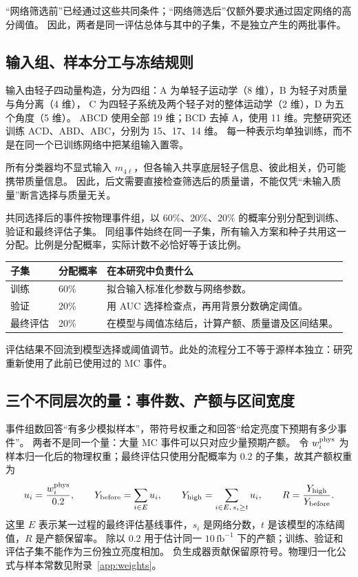 \documentclass[11pt,a4paper,fontset=fandol,scheme=plain]{ctexart}
\begin{document}
“网络筛选前”已经通过这些共同条件；“网络筛选后”仅额外要求通过固定网络的高分阈值。
因此，两者是同一评估总体与其中的子集，不是独立产生的两批事件。

\subsection{输入组、样本分工与冻结规则}

输入由轻子四动量构造，分为四组：A 为单轻子运动学（8 维），B 为轻子对质量与角分离（4 维），
C 为四轻子系统及两个轻子对的整体运动学（2 维），D 为五个角度（5 维）。
ABCD 使用全部 19 维；BCD 去掉 A，使用 11 维。完整研究还训练 ACD、ABD、ABC，分别为 15、17、14 维。
每一种表示均单独训练，而不是在同一个已训练网络中把某组输入置零。

所有分类器均不显式输入 $m_{4\ell}$，但各输入共享底层轻子信息、彼此相关，仍可能携带质量信息。
因此，后文需要直接检查筛选后的质量谱，不能仅凭“未输入质量”断言选择与质量无关。

共同选择后的事件按物理事件组，以 60\%、20\%、20\% 的概率分别分配到训练、验证和最终评估子集。
同组事件始终在同一子集，所有输入方案和种子共用这一分配。比例是分配概率，实际计数不必恰好等于该比例。

\begin{center}
\small
\begin{tabularx}{\linewidth}{@{}p{.14\linewidth}p{.18\linewidth}Y@{}}
\toprule
子集 & 分配概率 & 在本研究中负责什么 \\
\midrule
训练 & 60\% & 拟合输入标准化参数与网络参数。 \\
验证 & 20\% & 用 AUC 选择检查点，再用背景分数确定阈值。 \\
最终评估 & 20\% & 在模型与阈值冻结后，计算产额、质量谱及区间结果。 \\
\bottomrule
\end{tabularx}
\end{center}
评估结果不回流到模型选择或阈值调节。此处的流程分工不等于源样本独立：研究重新使用了此前已使用过的 MC 事件。

\subsection{三个不同层次的量：事件数、产额与区间宽度}

\label{sec:weights}
事件组数回答“有多少模拟样本”，带符号权重之和回答“给定亮度下预期有多少事件”。
两者不是同一个量：大量 MC 事件可以只对应少量预期产额。
令 $w_i^{\rm phys}$ 为样本归一化后的物理权重；最终评估只使用分配概率为 0.2 的子集，故其产额权重为
\[
 u_i=\frac{w_i^{\rm phys}}{0.2},\qquad
 Y_{\rm before}=\sum_{i\in E}u_i,\qquad
 Y_{\rm high}=\sum_{i\in E,\,s_i\geq t}u_i,\qquad
 R=\frac{Y_{\rm high}}{Y_{\rm before}}.
\]
这里 $E$ 表示某一过程的最终评估基线事件，$s_i$ 是网络分数，$t$ 是该模型的冻结阈值，$R$ 是产额保留率。
除以 0.2 用于估计同一 $10\,\mathrm{fb}^{-1}$ 下的产额；训练、验证和评估子集不能作为三份独立亮度相加。
负生成器贡献保留原符号。物理归一化公式与样本常数见附录~\ref{app:weights}。
\end{document}
